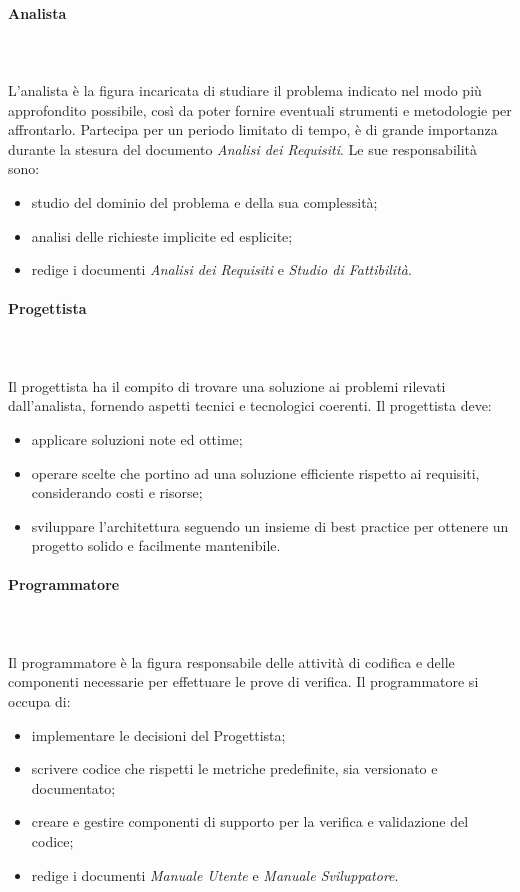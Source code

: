 			\paragraph{Analista} \mbox{}\\ \mbox{}\\
			L'analista è la figura incaricata di studiare il problema indicato nel modo più approfondito possibile, così da poter fornire eventuali strumenti e metodologie per affrontarlo. 
			Partecipa per un periodo limitato di tempo, è di grande importanza durante la stesura del documento \textit{Analisi dei Requisiti}.\newline
			Le sue responsabilità sono:
			\begin{itemize}
				\item studio del dominio del problema e della sua complessità;
				\item analisi delle richieste implicite ed esplicite;
				\item redige i documenti \textit{Analisi dei Requisiti} e \textit{Studio di Fattibilità}.
			\end{itemize}
			\paragraph{Progettista} \mbox{}\\ \mbox{}\\
			Il progettista ha il compito di trovare una soluzione ai problemi rilevati dall'analista, fornendo aspetti tecnici e tecnologici coerenti.\newline
			Il progettista deve:
			\begin{itemize}
				\item applicare soluzioni note ed ottime;
				\item operare scelte che portino ad una soluzione efficiente rispetto ai requisiti, considerando costi e risorse;
				\item sviluppare l'architettura seguendo un insieme di best practice per ottenere un progetto solido e facilmente mantenibile.
			\end{itemize}
			\paragraph{Programmatore} \mbox{}\\ \mbox{}\\
			Il programmatore è la figura responsabile delle attività di codifica e delle componenti necessarie per effettuare le prove di verifica.
			Il programmatore si occupa di:
			\begin{itemize}
				\item implementare le decisioni del Progettista;
				\item scrivere codice che rispetti le metriche predefinite, sia versionato e documentato;
				\item creare e gestire componenti di supporto per la verifica e validazione del codice;
				\item redige i documenti \textit{Manuale Utente} e \textit{Manuale Sviluppatore}.
			\end{itemize}
